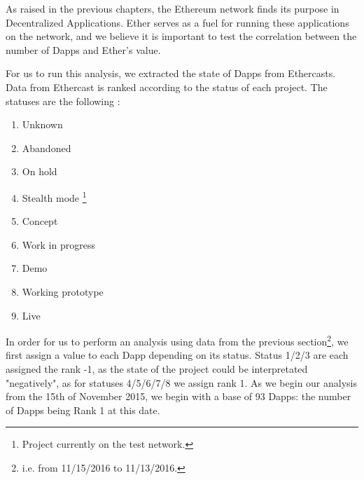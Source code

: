 \documentclass[11pt]{report}
\begin{document}
 As raised in the previous chapters, the Ethereum network finds its purpose in Decentralized Applications. Ether serves as a fuel for running these applications on the network, and we believe it is important to test the correlation between the number of Dapps and Ether's value. \newline
 
 For us to run this analysis, we extracted the state of Dapps from Ethercasts\cite{ETHERCASTS}. Data from Ethercast is ranked according to the status of each project. The statuses are the following : \begin{multicols}{2}
\begin{enumerate}
 \item Unknown
 \item Abandoned
 \item On hold
 \item Stealth mode \footnote{Project currently on the test network.}
 \item Concept
 \item Work in progress
 \item Demo
 \item Working prototype
 \item Live
 \end{enumerate}
 \end{multicols}
 
 In order for us to perform an analysis using data from the previous section\footnote{i.e. from 11/15/2016 to 11/13/2016.}, we first assign a value to each Dapp depending on its status. Status 1/2/3 are each assigned the rank -1, as the state of the project could be interpretated "negatively", as for statuses 4/5/6/7/8 we assign rank 1.
As we begin our analysis from the 15th of November 2015, we begin with a base of 93 Dapps: the number of Dapps being Rank 1 at this date.\newline
 
\end{document}
